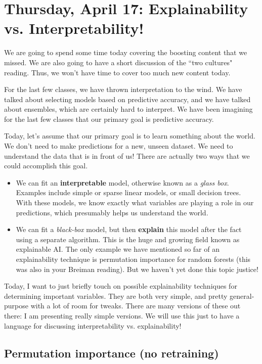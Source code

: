 \section{Thursday, April 17: Explainability vs. Interpretability!}

We are going to spend some time today covering the boosting content that we missed. We are also going to have a short discussion of the ``two cultures" reading. Thus, we won't have time to cover too much new content today. 

For the last few classes, we have thrown interpretation to the wind. We have talked about selecting models based on predictive accuracy, and we have talked about ensembles, which are certainly hard to interpret. We have been imagining for the last few classes that our primary goal is predictive accuracy.

Today, let's assume that our primary goal is to learn something about the world. We don't need to make predictions for a new, unseen dataset. We need to understand the data that is in front of us! There are actually two ways that we could accomplish this goal. 

\begin{itemize}
\item We can fit an \textbf{interpretable} model, otherwise known as a \emph{glass box}. Examples include simple or sparse linear models, or small decision trees. With these models, we know exactly what variables are playing a role in our predictions, which presumably helps us understand the world.
\item We can fit a \emph{black-box} model, but then \textbf{explain} this model after the fact using a separate algorithm. This is the huge and growing field known as explainable AI. The only example we have mentioned so far of an explainability technique is permutation importance for random forests (this was also in your Breiman reading). But we haven't yet done this topic justice!
\end{itemize}

Today, I want to just briefly touch on possible explainability techniques for determining important variables. They are both very simple, and pretty general-purpose with a lot of room for tweaks. There are many versions of these out there: I am presenting really simple versions. We will use this just to have a language for discussing interpretability vs. explainability! 

\subsection{Permutation importance (no retraining)}

